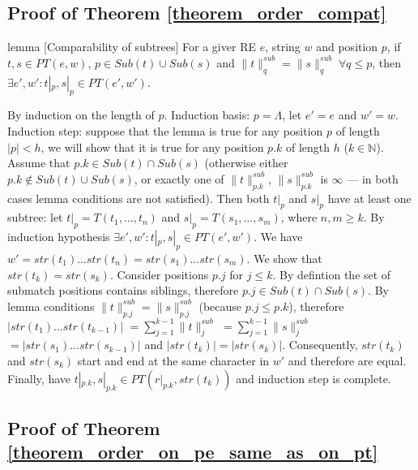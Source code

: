 \documentclass[AMA,STIX1COL]{WileyNJD-v2}
\newcommand{\YN}{\mathbb{N}}
\newcommand{\PT}{PT}
\newcommand{\snorm}[2]{\|{#1}\|^{sub}_{#2}}
\begin{document}


\subsection*{Proof of Theorem \ref{theorem_order_compat}}

\begin{theoremEnd}{lemma}
[Comparability of subtrees]
    \label{lemma_subtrees}
    For a giver RE $e$, string $w$ and position $p$,
    if $t, s \in \PT(e, w)$, $p \in Sub(t) \cup Sub(s)$ and $\snorm{t}{q} = \snorm{s}{q} \; \forall q \leq p$,
    then $\exists e', w' : t|_p, s|_p \in \PT(e', w')$.
\end{theoremEnd}
\begin{proofEnd}
    By induction on the length of $p$.
    Induction basis: $p = \Lambda$, let $e' = e$ and $w' = w$.
    Induction step: suppose that the lemma is true for any position $p$ of length
    $|p| < h$, we will show that it is true for any position $p.k$ of length $h$
    ($k \in \YN$).
    Assume that $p.k \in Sub(t) \cap Sub(s)$
    (otherwise either $p.k \not\in Sub(t) \cup Sub(s)$,
    or exactly one of $\snorm{t}{p.k}$, $\snorm{s}{p.k}$ is $\infty$ --- in both
    cases lemma conditions are not satisfied).
    Then both $t|_p$ and $s|_p$ have at least one subtree: let
    $t|_{p} = T(t_1, \dots, t_n)$ and
    $s|_{p} = T(s_1, \dots, s_m)$, where $n, m \geq k$.
    By induction hypothesis $\exists e', w' : t|_p, s|_p \in \PT(e', w')$.
    We have $w' = str(t_1) \dots str(t_n) = str(s_1) \dots str(s_m)$.
    We show that $str(t_k) = str(s_k)$.
    Consider positions $p.j$ for $j \leq k$.
    By defintion the set of submatch positions contains siblings,
    therefore $p.j \in Sub(t) \cap Sub(s)$.
    By lemma conditions $\snorm{t}{p.j} = \snorm{s}{p.j}$ (because $p.j \leq p.k$),
    therefore $|str(t_1) \dots str(t_{k-1})|$
    $= \sum\nolimits_{j=1}^{k-1}\snorm{t}{j}$
    $= \sum\nolimits_{j=1}^{k-1}\snorm{s}{j}$
    $= |str(s_1) \dots str(s_{k-1})|$ and
    $|str(t_k)| = |str(s_k)|$.
    Consequently, $str(t_k)$ and $str(s_k)$ start and end at the same character in $w'$ and therefore are equal.
    Finally, have $t|_{p.k}, s|_{p.k} \in PT(r|_{p.k}, str(t_k))$ and induction step is complete.
\end{proofEnd}



\subsection*{Proof of Theorem \ref{theorem_order_on_pe_same_as_on_pt}}
\end{document}
